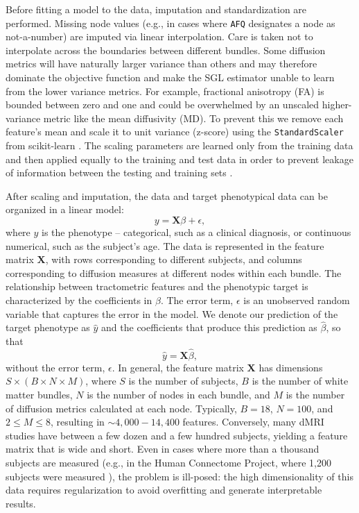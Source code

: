 \documentclass[10pt,letterpaper]{article}
\begin{document}
Before fitting a model to the data, imputation and standardization are
performed. Missing node values (e.g., in cases where \texttt{AFQ} designates
a node as not-a-number) are imputed via linear interpolation. Care is taken
not to interpolate across the boundaries between different bundles. Some
diffusion metrics will have naturally larger variance than others and may
therefore dominate the objective function and make the SGL estimator unable
to learn from the lower variance metrics. For example, fractional anisotropy
(FA) is bounded between zero and one and could be overwhelmed by an unscaled
higher-variance metric like the mean diffusivity (MD). To prevent this we
remove each feature's mean and scale it to unit variance (z-score) using the
\lstinline|StandardScaler| from scikit-learn \cite{scikit-learn}. The scaling
parameters are learned only from the training data and then applied equally
to the training and test data in order to prevent leakage of information
between the testing and training sets \cite{kaufman2012leakage}.

After scaling and imputation, the  data and target
phenotypical data can be organized in a linear model:
\begin{equation}
    y = \mathbf{X} \beta + \epsilon,
    \label{eq:lm}
\end{equation}
where $y$ is the phenotype -- categorical, such as a clinical diagnosis,
or continuous numerical, such as the subject's age. The 
data is represented in the feature matrix $\mathbf{X}$, with rows
corresponding to different subjects, and columns corresponding
to diffusion measures at different nodes within each bundle. The
relationship between tractometric features and the phenotypic target is
characterized by the coefficients in $\beta$. The error term, $\epsilon$
is an unobserved random variable that captures the error in the model.
We denote our prediction of the target phenotype as $\hat{y}$ and the
coefficients that produce this prediction as $\hat{\beta}$, so that
\begin{equation}
    \hat{y} = \mathbf{X} \hat{\beta},
    \label{eq:lm-approx}
\end{equation}
without the error term, $\epsilon$. In general, the feature matrix
$\mathbf{X}$ has dimensions $S \times (B \times N \times M)$, where $S$
is the number of subjects, $B$ is the number of white matter bundles,
$N$ is the number of nodes in each bundle, and $M$ is the number of
diffusion metrics calculated at each node. Typically, $B = 18$, $N =
100$, and $2 \le M \le 8$, resulting in $\sim 4,000 - 14,400$ features.
Conversely, many dMRI studies have between a few dozen and a few
hundred subjects, yielding a feature matrix that is wide and short.
Even in cases where more than a thousand subjects are measured (e.g.,
in the Human Connectome Project, where 1,200 subjects were measured
\cite{VanEssen2012}), the problem is ill-posed: the high dimensionality
of this data requires regularization to avoid overfitting and generate
interpretable results.
\end{document}
